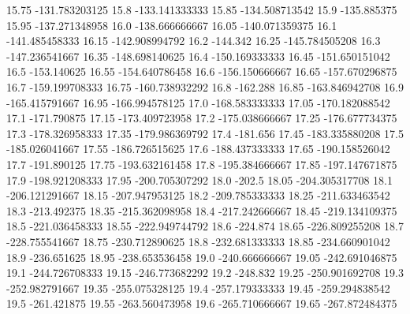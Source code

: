           15.75   -131.783203125
           15.8   -133.141333333
          15.85   -134.508713542
           15.9      -135.885375
          15.95   -137.271348958
           16.0   -138.666666667
          16.05   -140.071359375
           16.1   -141.485458333
          16.15   -142.908994792
           16.2         -144.342
          16.25   -145.784505208
           16.3   -147.236541667
          16.35   -148.698140625
           16.4   -150.169333333
          16.45   -151.650151042
           16.5      -153.140625
          16.55   -154.640786458
           16.6   -156.150666667
          16.65   -157.670296875
           16.7   -159.199708333
          16.75   -160.738932292
           16.8         -162.288
          16.85   -163.846942708
           16.9   -165.415791667
          16.95   -166.994578125
           17.0   -168.583333333
          17.05   -170.182088542
           17.1      -171.790875
          17.15   -173.409723958
           17.2   -175.038666667
          17.25   -176.677734375
           17.3   -178.326958333
          17.35   -179.986369792
           17.4         -181.656
          17.45   -183.335880208
           17.5   -185.026041667
          17.55   -186.726515625
           17.6   -188.437333333
          17.65   -190.158526042
           17.7      -191.890125
          17.75   -193.632161458
           17.8   -195.384666667
          17.85   -197.147671875
           17.9   -198.921208333
          17.95   -200.705307292
           18.0           -202.5
          18.05   -204.305317708
           18.1   -206.121291667
          18.15   -207.947953125
           18.2   -209.785333333
          18.25   -211.633463542
           18.3      -213.492375
          18.35   -215.362098958
           18.4   -217.242666667
          18.45   -219.134109375
           18.5   -221.036458333
          18.55   -222.949744792
           18.6         -224.874
          18.65   -226.809255208
           18.7   -228.755541667
          18.75   -230.712890625
           18.8   -232.681333333
          18.85   -234.660901042
           18.9      -236.651625
          18.95   -238.653536458
           19.0   -240.666666667
          19.05   -242.691046875
           19.1   -244.726708333
          19.15   -246.773682292
           19.2         -248.832
          19.25   -250.901692708
           19.3   -252.982791667
          19.35   -255.075328125
           19.4   -257.179333333
          19.45   -259.294838542
           19.5      -261.421875
          19.55   -263.560473958
           19.6   -265.710666667
          19.65   -267.872484375
